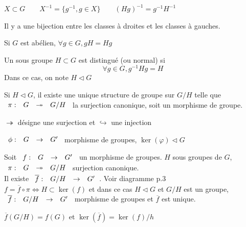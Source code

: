 \documentclass[]{report}
\begin{document}
    \begin{nt}{}{}
        $X\subset G\qquad X^{-1}=\{g^{-1},g\in X\}\qquad {(Hg)}^{-1}=g^{-1}H^{-1}$    
    \end{nt}

    \begin{prop}{}{}
        Il y a une bijection entre les classes à droites et les classes à gauches.
    \end{prop}

    \begin{re}{}{}
        Si $G$ est abélien, $\forall g\in G,gH=Hg$
    \end{re}

    \begin{df}{}{}
        Un sous groupe $H\subset G$ est distingué (ou normal) si
        \[\forall g\in G,g^{-1}Hg=H\]
        Dans ce cas, on note $H\triangleleft G$
    \end{df}

    \begin{tm}{}{}
        Si $H\triangleleft G$, il existe une unique structure de groupe sur $G/H$ telle que $\begin{array}{ccccc} \pi : & G & \twoheadrightarrow & G/H \end{array}$ la surjection canonique, soit un morphisme de groupe.
    \end{tm}

    \begin{nt}{}{}
        $\twoheadrightarrow$ désigne une surjection et $\hookrightarrow$ une injection
    \end{nt}

    \begin{ex}{}{}
        $\begin{array}{ccccc} \phi : & G & \to & G' \end{array}$ morphisme de groupes, $\ker(\varphi)\triangleleft G$
    \end{ex}

    \begin{tm}{}{}
        Soit $\begin{array}{ccccc} f : & G & \to & G' \end{array}$ un morphisme de groupes. $H$ sous groupes de $G$, $\begin{array}{ccccc} \pi : & G & \twoheadrightarrow & G/H \end{array}$ surjection canonique.\\
        Il existe $\begin{array}{ccccc} \overline{f} : & G/H & \to & G' \end{array}$. Voir diagramme p.3\\
        $f=\overline{f}\circ\pi\iff H\subset\ker(f)$ et dans ce cas $H\triangleleft G$ et $G/H$ est un groupe, $\begin{array}{ccccc} \overline{f} : & G/H & \to & G' \end{array}$ morphisme de groupes et $\overline{f}$ est unique.
    \end{tm}
    
    \begin{re}{}{}
        $\overline{f}(G/H)=f(G)$ et $\ker(\overline{f})=\ker(f)/h$
    \end{re}
\end{document}
